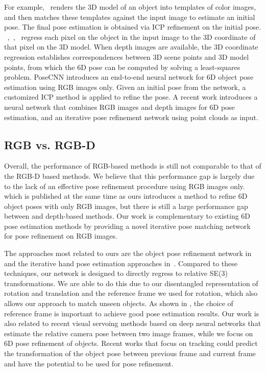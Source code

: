 \documentclass[twocolumn]{svjour3}
\begin{document}
For example,~\cite{hinterstoisser2012accv} renders the 3D model of an object into templates of color images, and then matches these templates against the input image to estimate an initial pose. The final pose estimation is obtained via ICP refinement on the initial pose. ~\cite{Brachmann2014Learning6O},~\cite{brachmann2016uncertainty},~\cite{michel2016global} regress each pixel on the object in the input image to the 3D coordinate of that pixel on the 3D model. When depth images are available, the 3D coordinate regression establishes correspondences between 3D scene points and 3D model points, from which the 6D pose can be computed by solving a least-squares problem. PoseCNN \citep{xiang2017posecnn} introduces an end-to-end neural network for 6D object pose estimation using RGB images only. Given an initial pose from the network, a customized ICP method is applied to refine the pose.  A recent work \citep{wang2019densefusion} introduces a neural network that combines RGB images and depth images for 6D pose estimation, and an iterative pose refinement network using point clouds as input.

\subsection{RGB vs. RGB-D}

Overall, the performance of RGB-based methods is still not comparable to that of the RGB-D based methods. We believe that this performance gap is largely due to the lack of an effective pose refinement procedure using RGB images only. \cite{manhardt2018deep} which is published at the same time as ours introduces a method to refine 6D object poses with only RGB images, but there is still a large performance gap between \cite{manhardt2018deep} and depth-based methods. Our work is complementary to existing 6D pose estimation methods by providing a novel iterative pose matching network for pose refinement on RGB images.


The approaches most related to ours are the object pose refinement network in~\cite{rad2017bb8} and the iterative hand pose estimation approaches in~\cite{carreiran2016hum,oberweger2015tra}. Compared to these techniques, our network is designed to directly regress to relative SE(3) transformations. We are able to do this due to our disentangled representation of rotation and translation and the reference frame we used for rotation, which also allows our approach to match unseen objects. As shown in \cite{mousavian20173d}, the choice of reference frame is important to achieve good pose estimation results. Our work is also related to recent visual servoing methods based on deep neural networks \citep{saxena2017exploring,costante2018ls} that estimate the relative camera pose between two image frames, while we focus on 6D pose refinement of objects. Recent works \citep{garon2016real,garon2017deep} that focus on tracking could predict the transformation of the object pose between previous frame and current frame and have the potential to be used for pose refinement.
\end{document}
